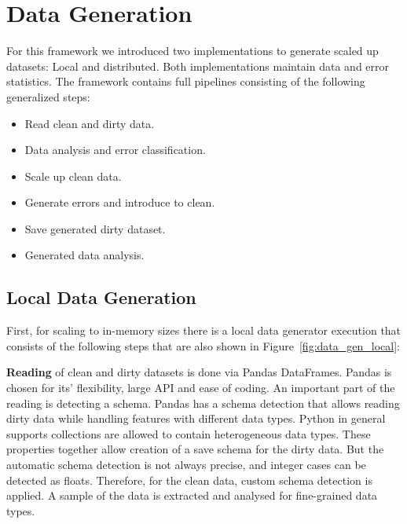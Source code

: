 \section{Data Generation}
\label{sec:data_gen}
For this framework we introduced two implementations to generate scaled up datasets: Local and distributed.
Both implementations maintain data and error statistics. 
The framework contains full pipelines consisting of the following generalized steps:

\begin{itemize}
    \item Read clean and dirty data.
    \item Data analysis and error classification.
    \item Scale up clean data.
    \item Generate errors and introduce to clean.
    \item Save generated dirty dataset.
    \item Generated data analysis.
\end{itemize}

\subsection{Local Data Generation}
\label{sec:local_generator}


First, for scaling to in-memory sizes there is a local data generator execution that consists of the following steps that are also shown in Figure~\ref{fig:data_gen_local}:


\textbf{Reading} of clean and dirty datasets is done via Pandas DataFrames. 
Pandas is chosen for its' flexibility, large API and ease of coding. 
An important part of the reading is detecting a schema.
Pandas has a schema detection that allows reading dirty data while handling features with different data types. 
Python in general supports collections are allowed to contain heterogeneous data types. 
These properties together allow creation of a save schema for the dirty data.
But the automatic schema detection is not always precise, and integer cases can be detected as floats. 
Therefore, for the clean data, custom schema detection is applied. A sample of the data is extracted and analysed for fine-grained data types. 


